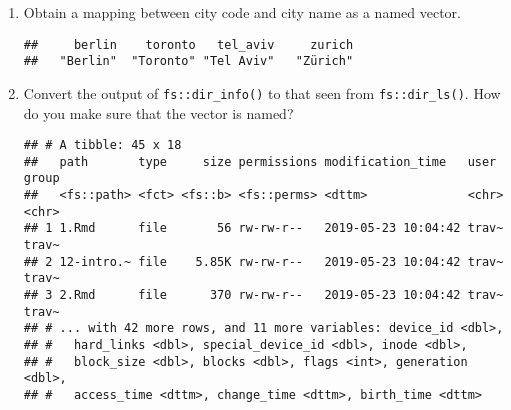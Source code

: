 \documentclass[]{book}
\newenvironment{Shaded}{\begin{snugshade}}{\end{snugshade}}
\newcommand{\CommentTok}[1]{\textcolor[rgb]{0.56,0.35,0.01}{\textit{#1}}}
\newcommand{\KeywordTok}[1]{\textcolor[rgb]{0.13,0.29,0.53}{\textbf{#1}}}
\newcommand{\NormalTok}[1]{#1}
\newcommand{\OperatorTok}[1]{\textcolor[rgb]{0.81,0.36,0.00}{\textbf{#1}}}
\newcommand{\StringTok}[1]{\textcolor[rgb]{0.31,0.60,0.02}{#1}}
\begin{document}
\begin{enumerate}
\def\labelenumi{\arabic{enumi}.}
\item
  Obtain a mapping between city code and city name as a named vector.

\begin{Shaded}
\end{Shaded}

\begin{verbatim}
##     berlin    toronto   tel_aviv     zurich 
##   "Berlin"  "Toronto" "Tel Aviv"   "Zürich"
\end{verbatim}
\item
  Convert the output of \texttt{fs::dir\_info()} to that seen from \texttt{fs::dir\_ls()}. How do you make sure that the vector is named?

\begin{Shaded}
\end{Shaded}

\begin{verbatim}
## # A tibble: 45 x 18
##   path       type     size permissions modification_time   user  group
##   <fs::path> <fct> <fs::b> <fs::perms> <dttm>              <chr> <chr>
## 1 1.Rmd      file       56 rw-rw-r--   2019-05-23 10:04:42 trav~ trav~
## 2 12-intro.~ file    5.85K rw-rw-r--   2019-05-23 10:04:42 trav~ trav~
## 3 2.Rmd      file      370 rw-rw-r--   2019-05-23 10:04:42 trav~ trav~
## # ... with 42 more rows, and 11 more variables: device_id <dbl>,
## #   hard_links <dbl>, special_device_id <dbl>, inode <dbl>,
## #   block_size <dbl>, blocks <dbl>, flags <int>, generation <dbl>,
## #   access_time <dttm>, change_time <dttm>, birth_time <dttm>
\end{verbatim}


\end{enumerate}
\end{document}
